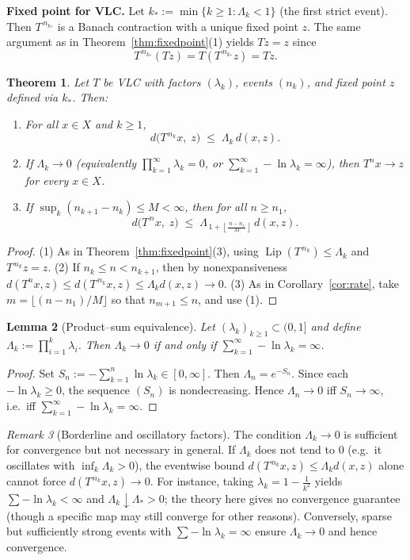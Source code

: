 \documentclass[11pt]{article}
\newtheorem{theorem}{Theorem}[section]
\newtheorem{lemma}[theorem]{Lemma}
\theoremstyle{definition}
\theoremstyle{remark}
\newtheorem{remark}[theorem]{Remark}
\DeclareMathOperator{\Lip}{Lip}
\begin{document}
\noindent\textbf{Fixed point for VLC.}
Let $k_\ast:=\min\{k\ge 1:\Lambda_k<1\}$ (the first strict event). Then $T^{\,n_{k_\ast}}$ is a Banach contraction with a unique fixed point $z$. The same argument as in Theorem~\ref{thm:fixedpoint}(1) yields $Tz=z$ since
\[
T^{\,n_{k_\ast}}(Tz)=T(T^{\,n_{k_\ast}}z)=Tz.
\]

\begin{theorem}\label{thm:vlc}
Let $T$ be VLC with factors $(\lambda_k)$, events $(n_k)$, and fixed point $z$ defined via $k_\ast$. Then:
\begin{enumerate}
\item For all $x\in X$ and $k\ge 1$,
\[
d\!\big(T^{\,n_k}x,\;z\big)\;\le\;\Lambda_k\, d(x,z).
\]
\item If $\Lambda_k\to 0$ (equivalently $\prod_{k=1}^\infty \lambda_k=0$, or $\sum_{k=1}^\infty -\ln\lambda_k=\infty$), then $T^n x\to z$ for every $x\in X$.
\item If $\sup_k (n_{k+1}-n_k)\le M<\infty$, then for all $n\ge n_1$,
\[
d\!\big(T^{\,n}x,\;z\big)\;\le\;\Lambda_{\,1+\left\lfloor \frac{\,n-n_1\,}{M}\right\rfloor}\, d(x,z).
\]
\end{enumerate}
\end{theorem}

\begin{proof}
(1) As in Theorem~\ref{thm:fixedpoint}(3), using $\Lip(T^{\,n_k})\le \Lambda_k$ and $T^{\,n_k}z=z$.
(2) If $n_k\le n< n_{k+1}$, then by nonexpansiveness $d(T^n x,z)\le d(T^{\,n_k}x,z)\le \Lambda_k d(x,z)\to 0$.
(3) As in Corollary~\ref{cor:rate}, take $m=\lfloor (n-n_1)/M\rfloor$ so that $n_{m+1}\le n$, and use (1).
\end{proof}

\begin{lemma}[Product--sum equivalence]\label{lem:prod-sum}
Let $(\lambda_k)_{k\ge1}\subset (0,1]$ and define $\Lambda_k:=\prod_{i=1}^k\lambda_i$. Then $\Lambda_k\to 0$ if and only if $\sum_{k=1}^\infty -\ln\lambda_k=\infty$.
\end{lemma}

\begin{proof}
Set $S_n:=-\sum_{k=1}^n \ln\lambda_k\in[0,\infty]$. Then $\Lambda_n=e^{-S_n}$. Since each $-\ln\lambda_k\ge 0$, the sequence $(S_n)$ is nondecreasing. Hence $\Lambda_n\to 0$ iff $S_n\to\infty$, i.e.\ iff $\sum_{k=1}^\infty -\ln\lambda_k=\infty$.
\end{proof}

\begin{remark}[Borderline and oscillatory factors]\label{rem:borderline}
The condition $\Lambda_k\to 0$ is sufficient for convergence but not necessary in general. If $\Lambda_k$ does not tend to $0$ (e.g.\ it oscillates with $\inf_k \Lambda_k>0$), the eventwise bound
$d(T^{\,n_k}x,z)\le \Lambda_k d(x,z)$ alone cannot force $d(T^{\,n_k}x,z)\to 0$. For instance, taking $\lambda_k=1-\frac{1}{k^2}$ yields $\sum -\ln\lambda_k<\infty$ and $\Lambda_k\downarrow \Lambda_\ast>0$; the theory here gives no convergence guarantee (though a specific map may still converge for other reasons). Conversely, sparse but sufficiently strong events with $\sum -\ln\lambda_k=\infty$ ensure $\Lambda_k\to 0$ and hence convergence.
\end{remark}
\end{document}
